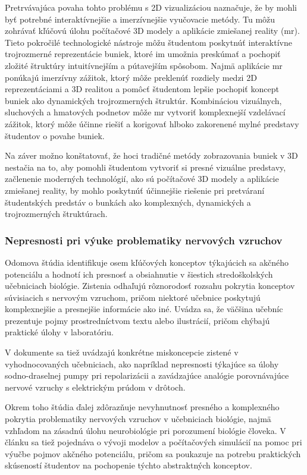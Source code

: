 Pretrvávajúca povaha tohto problému s 2D vizualizáciou naznačuje, že by mohli byť potrebné interaktívnejšie a imerzívnejšie vyučovacie metódy. Tu môžu zohrávať kľúčovú úlohu počítačové 
3D modely a aplikácie zmiešanej reality (\acrshort{mr}). Tieto pokročilé technologické nástroje môžu študentom poskytnúť interaktívne trojrozmerné reprezentácie buniek, ktoré im umožnia preskúmať a 
pochopiť zložité štruktúry intuitívnejším a pútavejším spôsobom. Najmä aplikácie \acrshort{mr} ponúkajú imerzívny zážitok, ktorý môže preklenúť rozdiely medzi 2D reprezentáciami a 3D realitou a pomôcť 
študentom lepšie pochopiť koncept buniek ako dynamických trojrozmerných štruktúr. Kombináciou vizuálnych, sluchových a hmatových podnetov môže \acrshort{mr} vytvoriť komplexnejší vzdelávací zážitok, 
ktorý môže účinne riešiť a korigovať hlboko zakorenené mylné predstavy študentov o povahe buniek.

Na záver možno konštatovať, že hoci tradičné metódy zobrazovania buniek v 3D nestačia na to, aby pomohli študentom vytvoriť si presné vizuálne predstavy, začlenenie moderných technológií, 
ako sú počítačové 3D modely a aplikácie zmiešanej reality, by mohlo poskytnúť účinnejšie riešenie pri pretváraní študentských predstáv o bunkách ako komplexných, dynamických a trojrozmerných štruktúrach.

\subsubsection{Nepresnosti pri výuke problematiky nervových vzruchov}
Odomova štúdia \cite{odomActionPotentialsBiology1993} identifikuje osem kľúčových konceptov týkajúcich sa akčného potenciálu a hodnotí ich presnosť a obsiahnutie v šiestich 
stredoškolských učebniciach biológie. Zistenia odhaľujú rôznorodosť rozsahu pokrytia konceptov súvisiacich s nervovým vzruchom, pričom niektoré učebnice poskytujú komplexnejšie 
a presnejšie informácie ako iné. Uvádza sa, že väčšina učebníc prezentuje pojmy prostredníctvom textu alebo ilustrácií, pričom chýbajú praktické úlohy v laboratóriu. 

V dokumente sa tiež uvádzajú konkrétne miskoncepcie zistené v vyhodnocovaných učebniciach, ako napríklad nepresnosti týkajúce sa úlohy sodno-draselnej pumpy pri repolarizácii 
a zavádzajúce analógie porovnávajúce nervové vzruchy s elektrickým prúdom v drôtoch. 

Okrem toho štúdia ďalej zdôrazňuje nevyhnutnosť presného a komplexného pokrytia problematiky nervových vzruchov v učebniciach biológie, najmä vzhľadom na zásadnú úlohu neurobiológie 
pri porozumení biológie človeka. V článku sa tiež pojednáva o vývoji modelov a počítačových simulácií na pomoc pri výučbe pojmov akčného potenciálu, pričom sa poukazuje na potrebu 
praktických skúseností študentov na pochopenie týchto abstraktných konceptov. 

